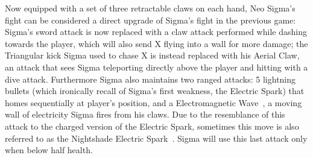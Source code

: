 Now equipped with a set of three retractable claws on each hand, Neo Sigma's fight can be considered a direct upgrade of Sigma's fight in the previous game: Sigma's sword attack is now replaced with a claw attack performed while dashing towards the player, which will also send X flying into a wall for more damage; the Triangular kick Sigma used to chase X is instead replaced with his Aerial Claw, an attack that sees Sigma teleporting directly above the player and hitting with a dive attack. Furthermore Sigma also maintains two ranged attacks: 5 lightning bullets (which ironically recall of Sigma's first weakness, the Electric Spark) that homes sequentially at player's position, and a Electromagnetic Wave~\cite{book:Compendium}, a moving wall of electricity Sigma fires from his claws. Due to the resemblance of this attack to the charged version of the Electric Spark, sometimes this move is also referred to as the Nightshade Electric Spark~\cite{book:MH_field_guide}. Sigma will use this last attack only when below half health.


